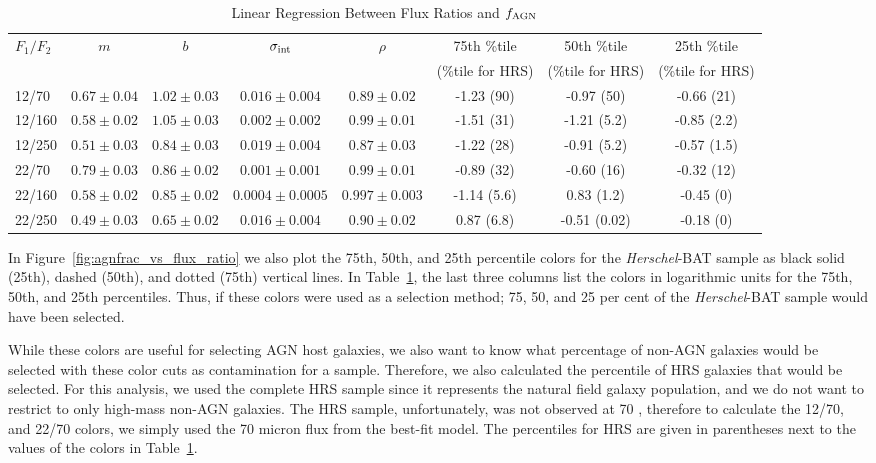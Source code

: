 \documentclass[fleqn, usenatbib]{mnras}
\newcommand{\herschel}{\emph{Herschel}}
\begin{document}
\begin{table}
\begin{threeparttable}
\captionsetup{font=small,labelfont=bf,labelsep=period}
\caption{Linear Regression Between Flux Ratios and $f_{\rm AGN}$\label{tab:flux_ratio_fagn_linreg}}
\begin{tabular}{lccccccc}
\toprule 
$F_{1}/F_{2}$ & $m$ & $b$  & $\sigma_{\rm int}$ & $\rho$ & 75th \%tile  & 50th \%tile  & 25th \%tile\\
&&&&&(\%tile for HRS)&(\%tile for HRS)&(\%tile for HRS)\\
\midrule
12/70      & $0.67\pm0.04$ & $1.02\pm0.03$ & $0.016\pm0.004$ & $0.89\pm0.02$ & -1.23 (90) & -0.97 (50) & -0.66 (21)\\
12/160    & $0.58\pm0.02$ & $1.05\pm0.03$ & $0.002\pm0.002$ & $0.99\pm0.01$ & -1.51 (31) & -1.21 (5.2) & -0.85 (2.2)\\
12/250    & $0.51\pm0.03$ & $0.84\pm0.03$ & $0.019\pm0.004$ & $0.87\pm0.03$ & -1.22 (28) &  -0.91 (5.2) & -0.57 (1.5)\\
22/70      & $0.79\pm0.03$ & $0.86\pm0.02$ & $0.001\pm0.001$ & $0.99\pm0.01$ & -0.89 (32) & -0.60 (16) & -0.32 (12)\\
22/160    & $0.58\pm0.02$ & $0.85\pm0.02$ & $0.0004\pm0.0005$ & $0.997\pm0.003$ & -1.14 (5.6) & 0.83 (1.2) & -0.45 (0)\\
22/250    & $0.49\pm0.03$ & $0.65\pm0.02$ & $0.016\pm0.004$ & $0.90\pm0.02$ & 0.87 (6.8) & -0.51 (0.02) & -0.18 (0) \\
\bottomrule
\end{tabular}
\end{threeparttable}
\end{table}

{\color{red}In Figure~\ref{fig:agnfrac_vs_flux_ratio} we also plot the 75th, 50th, and 25th percentile colors for the \herschel-BAT sample as black solid (25th), dashed (50th), and dotted (75th) vertical lines. In Table~\ref{tab:flux_ratio_fagn_linreg}, the last three columns list the colors in logarithmic units for the 75th, 50th, and 25th percentiles. Thus, if these colors were used as a selection method; 75, 50, and 25 per cent of the \herschel-BAT sample would have been selected.}

While these colors are useful for selecting AGN host galaxies, we also want to know what percentage of non-AGN galaxies would be selected with these color cuts as contamination for a sample. Therefore, we also calculated the percentile of HRS galaxies that would be selected. For this analysis, we used the complete HRS sample since it represents the natural field galaxy population, and we do not want to restrict to only high-mass non-AGN galaxies. The HRS sample, unfortunately, was not observed at 70 \micron, therefore to calculate the 12/70, and 22/70 colors, we simply used the 70 micron flux from the best-fit model. The percentiles for HRS are given in parentheses next to the values of the colors in Table~\ref{tab:flux_ratio_fagn_linreg}. 
\end{document}

